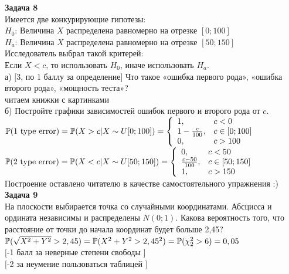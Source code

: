 \documentclass[12pt, a4paper]{article}\usepackage[]{graphicx}\usepackage[]{color}
\begin{document}
{\bf Задача 8} \\
Имеется две конкурирующие гипотезы: \\
$H_{0}$: Величина $X$ распределена равномерно на отрезке $[0;100]$ \\
$H_{a}$: Величина $X$ распределена равномерно на отрезке $[50;150]$ \\
Исследователь выбрал такой критерей: \\
Если $X<c$, то использовать $H_{0}$, иначе использовать $H_{a}$. \\
а) $[$3, по 1 баллу за определение$]$ Что такое «ошибка первого
рода», «ошибка второго рода»,
«мощность теста»? \\
читаем книжки с картинками \\
б) Постройте графики зависимостей ошибок первого и второго рода от
$c$. \\
$\P(\text{1 type error})=\P(X>c|X\sim U[0;100])= \left\{
\begin{array}{ll}
  1, & c<0 \\
  1-\frac{c}{100}, & c \in [0;100] \\
  0, & c>100 \\
\end{array}
\right.$ \\
$\P(\text{2 type error})=\P(X<c|X\sim U[50;150])= \left\{
\begin{array}{ll}
  0, & c<50 \\
  \frac{c-50}{100}, & c \in [50;150] \\
  1, & c>150 \\
\end{array}
\right.$ \\
Построение оставлено читателю в качестве самостоятельного
упражнения :) \\

{\bf Задача 9} \\
На плоскости выбирается точка со случайными координатами. Абсцисса
и ордината независимы и распределены $N(0;1)$. Какова вероятность
того, что расстояние от точки до начала координат будет больше
2,45? \\
$\P(\sqrt{X^{2}+Y^{2}}>2,45)=\P(X^{2}+Y^{2}>2,45^{2})=\P(\chi_{2}^{2}>6)=0,05$
\\
$[$-1 балл за неверные степени свободы $]$ \\
$[$-2 за неумение пользоваться таблицей $]$ \\
\end{document}
